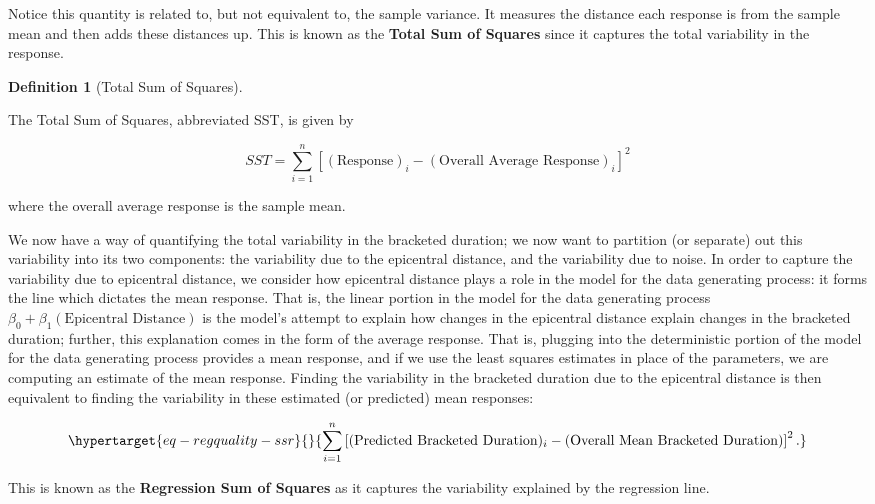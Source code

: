 \documentclass[
  letterpaper,
  DIV=11,
  numbers=noendperiod]{scrreprt}
\theoremstyle{definition}
\newtheorem{definition}{Definition}[chapter]
\theoremstyle{definition}
\theoremstyle{plain}
\theoremstyle{remark}
\begin{document}
Notice this quantity is related to, but not equivalent to, the sample
variance. It measures the distance each response is from the sample mean
and then adds these distances up. This is known as the \textbf{Total Sum
of Squares} since it captures the total variability in the response.

\begin{definition}[Total Sum of
Squares]\protect\hypertarget{def-sst}{}\label{def-sst}

The Total Sum of Squares, abbreviated SST, is given by

\[SST = \sum_{i=1}^{n} \left[(\text{Response})_i - (\text{Overall Average Response})_i\right]^2\]

where the overall average response is the sample mean.

\end{definition}

We now have a way of quantifying the total variability in the bracketed
duration; we now want to partition (or separate) out this variability
into its two components: the variability due to the epicentral distance,
and the variability due to noise. In order to capture the variability
due to epicentral distance, we consider how epicentral distance plays a
role in the model for the data generating process: it forms the line
which dictates the mean response. That is, the linear portion in the
model for the data generating process
\(\beta_0 + \beta_1 (\text{Epicentral Distance})\) is the model's
attempt to explain how changes in the epicentral distance explain
changes in the bracketed duration; further, this explanation comes in
the form of the average response. That is, plugging into the
deterministic portion of the model for the data generating process
provides a mean response, and if we use the least squares estimates in
place of the parameters, we are computing an estimate of the mean
response. Finding the variability in the bracketed duration due to the
epicentral distance is then equivalent to finding the variability in
these estimated (or predicted) mean responses:

\begin{equation}\protect\hypertarget{eq-regquality-ssr}{}{\sum_{i=1}^{n} \left[(\text{Predicted Bracketed Duration})_i - (\text{Overall Mean Bracketed Duration})\right]^2.}\label{eq-regquality-ssr}\end{equation}

This is known as the \textbf{Regression Sum of Squares} as it captures
the variability explained by the regression line.
\end{document}
